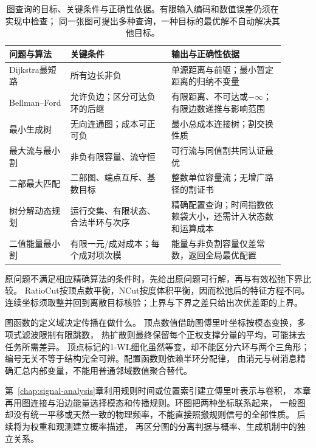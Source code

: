\begin{table}[htbp]
  \centering
  \caption{图查询的目标、关键条件与正确性依据。有限输入编码和数值误差仍须在实现中检查；
  同一张图可提出多种查询，一种目标的最优解不自动解决其他目标。}
  \label{tab:graph-algorithm-conditions}
  \begin{tabular}{p{0.20\linewidth}p{0.33\linewidth}p{0.37\linewidth}}
    \toprule
    问题与算法 & 关键条件 & 输出与正确性依据\\
    \midrule
    Dijkstra最短路 & 所有边长非负 & 单源距离与前驱；最小暂定距离的归纳不变量\\
    Bellman--Ford & 允许负边；区分可达负环的后继 & 有限距离、不可达或\(-\infty\)；
      有限边数递推与影响范围\\
    最小生成树 & 无向连通图；成本可正可负 & 最小总成本连接树；割交换性质\\
    最大流与最小割 & 非负有限容量、流守恒 & 可行流与同值割共同认证最优\\
    二部最大匹配 & 二部图、端点互斥、基数目标 & 整数单位容量流；无增广路径的割证书\\
    树分解动态规划 & 运行交集、有限状态、合法半环与次序 &
      精确配置查询；时间指数依赖袋大小，还需计入状态数和运算成本\\
    二值能量最小割 & 有限一元/成对成本；每个成对项次模 &
      能量与非负割容量仅差常数，返回全局最优配置\\
    \bottomrule
  \end{tabular}
\end{table}

原问题不满足相应精确算法的条件时，先给出原问题可行解，再与有效松弛下界比较。
RatioCut按顶点数平衡，NCut按度体积平衡，因而松弛后的特征方程不同。
连续坐标须取整并回到离散目标核验；上界与下界之差只给出次优差距的上界。

图函数的定义域决定传播在做什么。
顶点数值借助图傅里叶坐标按模态变换，多项式滤波限制有限跳数，
热扩散则最终保留每个正权支撑分量的平均，可能抹去任务所需差异。
顶点标记的1-WL细化虽然等变，却不能区分六环与两个三角形；
编号无关不等于结构完全可辨。配置函数则依赖半环分配律，
由消元与树消息精确汇总内部变量，不能用普通邻域数值聚合替代。

第~\ref{chap:signal-analysis}章利用规则时间或位置索引建立傅里叶表示与卷积，
本章再用图连接与沿边能量选择模态和传播规则。环图把两种坐标联系起来，
一般图却没有统一平移或天然一致的物理频率，不能直接照搬规则信号的全部性质。
后续将为权重和观测建立概率描述，
再区分图的分离判据与概率、生成机制中的独立关系。
